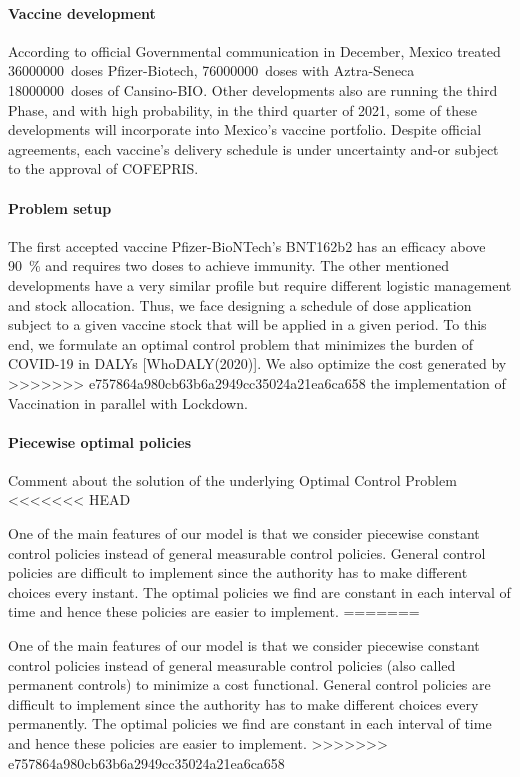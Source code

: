 \paragraph{Vaccine development}
        According to official Governmental communication in December, Mexico 
    treated  \SI{36000000}{doses} Pfizer-Biotech, \SI{76000000}{doses} with 
    Aztra-Seneca \SI{18000000}{doses} of Cansino-BIO. Other developments 
    also are running the  third Phase, and with high probability,  in the 
    third quarter of 2021, some of these developments will incorporate into 
    Mexico's vaccine portfolio. Despite official agreements, each vaccine's 
    delivery schedule is under uncertainty and-or subject to the approval 
    of COFEPRIS.
\paragraph{Problem setup}
        The first accepted vaccine \textemdash Pfizer-BioNTech's BNT162b2 
    \textemdash has an efficacy above \SI{90}{\percent}  and requires 
    two doses to achieve immunity. The other mentioned developments have a very 
    similar profile but require different logistic management and stock 
    allocation.  Thus, we face designing a schedule of dose application subject 
    to a given vaccine stock that will be applied in a given period. To this 
    end, we formulate an optimal control problem that minimizes the burden of 
    COVID-19 in DALYs [WhoDALY(2020)]. We also optimize the cost generated by 
>>>>>>> e757864a980cb63b6a2949cc35024a21ea6ca658
    the implementation of Vaccination in parallel with Lockdown.

\paragraph{Piecewise optimal policies}
    Comment about the solution of the underlying Optimal Control Problem
<<<<<<< HEAD

One of the main features of our model is that we consider piecewise constant
control policies instead of general measurable control policies. General
control policies are difficult to implement since the authority has to make
different choices every instant. The optimal policies we find are constant in
each interval of time and hence these policies are easier to implement.
=======
    
One of the main features of our model is that we consider piecewise constant control policies instead of general measurable control policies (also called permanent controls) to minimize a cost functional. General control policies are difficult to implement since the authority has to make different choices every permanently. The optimal policies we find are constant in each interval of time and hence these policies are easier to implement. 
>>>>>>> e757864a980cb63b6a2949cc35024a21ea6ca658


